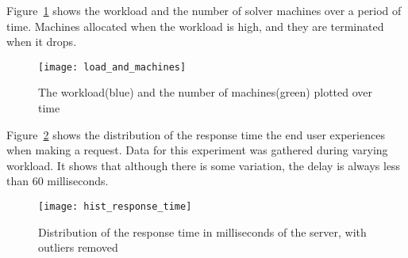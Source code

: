 Figure~\ref{fig:asdf} shows the workload and the number of solver machines over a period of time. Machines allocated when the workload is high, and they are terminated when it drops. 

\begin{figure}[H]
	\texttt{[image: load\_and\_machines]}
	\caption{The workload(blue) and the number of machines(green) plotted over time}
	\label{fig:asdf}
\end{figure}


Figure~\ref{fig:exp:response} shows the distribution of the response time the end user experiences when making a request. Data for this experiment was gathered during varying workload. It shows that although there is some variation, the delay is always less than 60 milliseconds.

\begin{figure}[H]
	\texttt{[image: hist\_response\_time]}
	\caption{Distribution of the response time in milliseconds of the server, with outliers removed}
	\label{fig:exp:response}
\end{figure}
